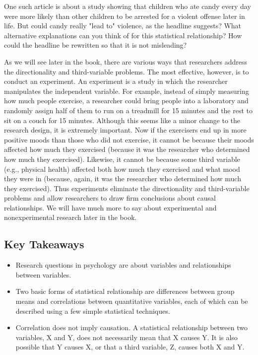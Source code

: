 One such article is about a study showing that children who ate candy every day were more likely than other children to be arrested for a violent offense later in life. But could candy really "lead to" violence, as the headline suggests? What alternative explanations can you think of for this statistical relationship? How could the headline be rewritten so that it is not misleading?

As we will see later in the book, there are various ways that researchers address the directionality and third-variable problems. The most effective, however, is to conduct an experiment. An experiment is a study in which the researcher manipulates the independent variable. For example, instead of simply measuring how much people exercise, a researcher could bring people into a laboratory and randomly assign half of them to run on a treadmill for 15 minutes and the rest to sit on a couch for 15 minutes. Although this seems like a minor change to the research design, it is extremely important. Now if the exercisers end up in more positive moods than those who did not exercise, it cannot be because their moods affected how much they exercised (because it was the researcher who determined how much they exercised). Likewise, it cannot be because some third variable (e.g., physical health) affected both how much they exercised and what mood they were in (because, again, it was the researcher who determined how much they exercised). Thus experiments eliminate the directionality and third-variable problems and allow researchers to draw firm conclusions about causal relationships. We will have much more to say about experimental and nonexperimental research later in the book.

\subsection{Key Takeaways}
\begin{fullwidth}
  \begin{itemize}
  \item Research questions in psychology are about variables and relationships between variables.
  \item Two basic forms of statistical relationship are differences between group means and correlations
  between quantitative variables, each of which can be described using a few simple statistical
  techniques.
  \item Correlation does not imply causation. A statistical relationship between two variables, X and Y,
  does not necessarily mean that X causes Y. It is also possible that Y causes X, or that a third variable, Z, causes both X and Y.
  \end{itemize}
\end{fullwidth}

